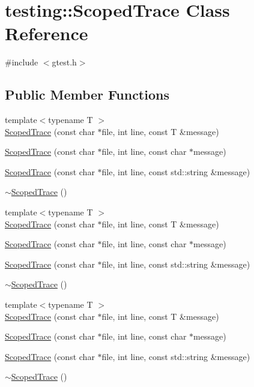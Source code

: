 \hypertarget{classtesting_1_1_scoped_trace}{}\section{testing\+::Scoped\+Trace Class Reference}
\label{classtesting_1_1_scoped_trace}


{\ttfamily \#include $<$gtest.\+h$>$}

\subsection*{Public Member Functions}
\begin{DoxyCompactItemize}
\item 
{\footnotesize template$<$typename T $>$ }\\\mbox{\hyperlink{classtesting_1_1_scoped_trace_a2da90b95d682d518cca472934d53c59c}{Scoped\+Trace}} (const char $\ast$file, int line, const T \&message)
\item 
\mbox{\hyperlink{classtesting_1_1_scoped_trace_accd2a06cc941ffd7d6fe109adfdb4f19}{Scoped\+Trace}} (const char $\ast$file, int line, const char $\ast$message)
\item 
\mbox{\hyperlink{classtesting_1_1_scoped_trace_a1f453a2aade0db6955a111a7cb329615}{Scoped\+Trace}} (const char $\ast$file, int line, const std\+::string \&message)
\item 
\mbox{\hyperlink{classtesting_1_1_scoped_trace_aa8320ec2679f205cf2c14f508ba35b4d}{$\sim$\+Scoped\+Trace}} ()
\item 
{\footnotesize template$<$typename T $>$ }\\\mbox{\hyperlink{classtesting_1_1_scoped_trace_a2da90b95d682d518cca472934d53c59c}{Scoped\+Trace}} (const char $\ast$file, int line, const T \&message)
\item 
\mbox{\hyperlink{classtesting_1_1_scoped_trace_accd2a06cc941ffd7d6fe109adfdb4f19}{Scoped\+Trace}} (const char $\ast$file, int line, const char $\ast$message)
\item 
\mbox{\hyperlink{classtesting_1_1_scoped_trace_a1f453a2aade0db6955a111a7cb329615}{Scoped\+Trace}} (const char $\ast$file, int line, const std\+::string \&message)
\item 
\mbox{\hyperlink{classtesting_1_1_scoped_trace_aa8320ec2679f205cf2c14f508ba35b4d}{$\sim$\+Scoped\+Trace}} ()
\item 
{\footnotesize template$<$typename T $>$ }\\\mbox{\hyperlink{classtesting_1_1_scoped_trace_a2da90b95d682d518cca472934d53c59c}{Scoped\+Trace}} (const char $\ast$file, int line, const T \&message)
\item 
\mbox{\hyperlink{classtesting_1_1_scoped_trace_accd2a06cc941ffd7d6fe109adfdb4f19}{Scoped\+Trace}} (const char $\ast$file, int line, const char $\ast$message)
\item 
\mbox{\hyperlink{classtesting_1_1_scoped_trace_a1f453a2aade0db6955a111a7cb329615}{Scoped\+Trace}} (const char $\ast$file, int line, const std\+::string \&message)
\item 
\mbox{\hyperlink{classtesting_1_1_scoped_trace_aa8320ec2679f205cf2c14f508ba35b4d}{$\sim$\+Scoped\+Trace}} ()
\end{DoxyCompactItemize}

